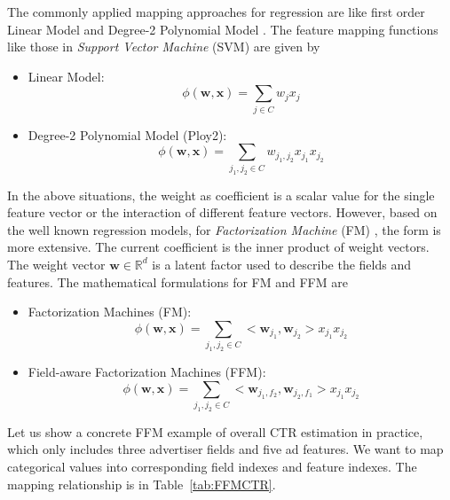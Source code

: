 The commonly applied mapping approaches for regression are like first order Linear Model and Degree-2 Polynomial Model . The feature mapping functions like those in \emph{Support Vector Machine} (SVM) are given by
\begin{itemize}
  \item Linear Model:
	\begin{equation}
	\phi (\mathbf{w},\mathbf{x})=\sum_{j \in C}w_{j}x_{j}
	\end{equation}
  \item Degree-2 Polynomial Model (Ploy2):
	\begin{equation}
	\phi (\mathbf{w},\mathbf{x})=\sum_{j_1,j_2 \in C}{w}_{j_1, j_2}x_{j_1}x_{j_2}
	\end{equation}
\end{itemize}
In the above situations, the weight as coefficient is a scalar value for the single feature vector or the interaction of different feature vectors.  However, based on the well known regression models, for \emph{Factorization Machine} (FM) \cite{michaeljahrerandreastscherjeongyoonleejingjingdeng2012}, the form is more extensive. The current coefficient is the inner product of weight vectors. The weight vector $\mathbf{w} \in \mathbb{R}^{d} $ is a latent factor used to describe the fields and features. The mathematical formulations for FM and FFM \cite{steffenrendlelarsschmidtthieme2010} are
\begin{itemize}
	\item Factorization Machines (FM):
		\begin{equation}
		\phi (\mathbf{w},\mathbf{x})=\sum_{j_1,j_2 \in C}<\mathbf{w}_{j_1},\mathbf{w}_{j_2}>x_{j_1}x_{j_2}
		\end{equation}
	\item Field-aware Factorization Machines (FFM):
		\begin{equation}
		\phi (\mathbf{w},\mathbf{x})=\sum_{j_1,j_2 \in C}<\mathbf{w}_{j_1,f_2},\mathbf{w}_{j_2,f_1}>x_{j_1}x_{j_2}
		\end{equation}		
\end{itemize}

Let us show a concrete FFM example of overall CTR estimation in practice, which only includes three advertiser fields and five ad features. We want to map categorical values into corresponding field indexes and feature indexes. The mapping relationship is in Table~\ref{tab:FFMCTR}.

